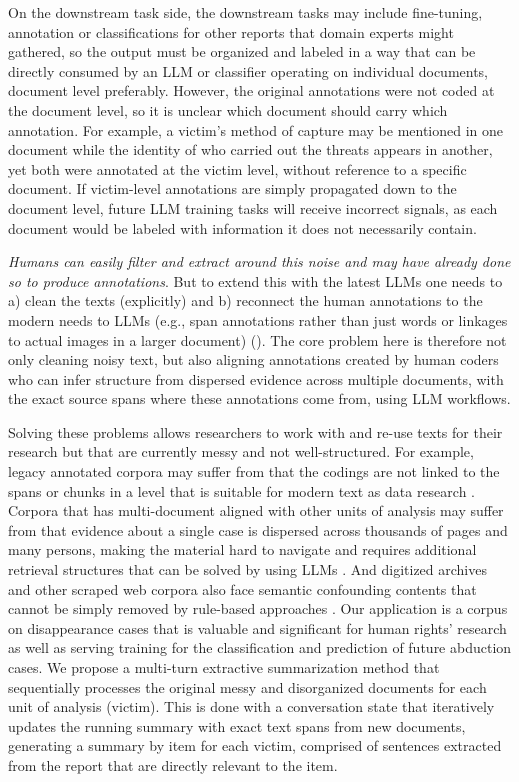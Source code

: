 \documentclass{article}
\begin{document}
On the downstream task side, the downstream tasks may include fine-tuning, annotation or classifications for other reports that domain experts might gathered, so the output must be organized and labeled in a way that can be directly consumed by an LLM or classifier operating on individual documents, document level preferably. However, the original annotations were not coded at the document level, so it is unclear which document should carry which annotation. For example, a victim's method of capture may be mentioned in one document while the identity of who carried out the threats appears in another, yet both were annotated at the victim level, without reference to a specific document. If victim-level annotations are simply propagated down to the document level, future LLM training tasks will receive incorrect signals, as each document would be labeled with information it does not necessarily contain.

\emph{Humans can easily filter and extract around this noise and may have already done so to produce annotations}.  But to extend this with the latest LLMs one needs to a) clean the texts (explicitly) and b) reconnect the human annotations to the modern needs to LLMs (e.g., span annotations rather than just words or linkages to actual images in a larger document) (\cite{olsen-etal-2024-socio}). The core problem here is therefore not only cleaning noisy text, but also aligning annotations created by human coders who can infer structure from dispersed evidence across multiple documents, with the exact source spans where these annotations come from, using LLM workflows.

Solving these problems allows researchers to work with and re-use texts for their research but that are currently messy and not well-structured. For example, legacy annotated corpora may suffer from that the codings are not linked to the spans or chunks in a level that is suitable for modern text as data research \cite{Escott2018}. Corpora that has multi-document aligned with other units of analysis may suffer from that evidence about a single case is dispersed across thousands of pages and many persons, making the material hard to navigate and requires additional retrieval structures that can be solved by using LLMs \cite{Gibbs_etal2010}. And digitized archives and other scraped web corpora also face semantic confounding contents that cannot be simply removed by rule-based approaches \cite{HurtadoBodell_etal2022, Molina_etal2025}.  Our application is a corpus on disappearance cases that is valuable and significant for human rights' research as well as serving training for the classification and prediction of future abduction cases. We propose a multi-turn extractive summarization method that sequentially processes the original messy and disorganized documents for each unit of analysis (victim).  This is done with a conversation state that iteratively updates the running summary with exact text spans from new documents, generating a summary by item for each victim, comprised of sentences extracted from the report that are directly relevant to the item.
\end{document}
